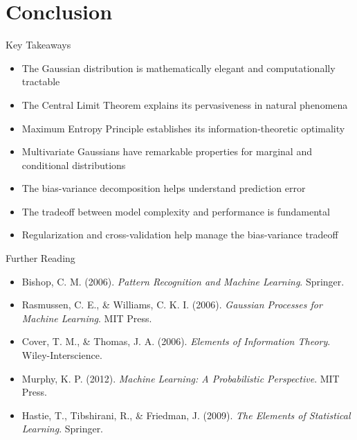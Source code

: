 \documentclass{beamer}
\begin{document}
\section{Conclusion}

\begin{frame}{Key Takeaways}
  \begin{itemize}
    \item The Gaussian distribution is mathematically elegant and computationally tractable
    \item The Central Limit Theorem explains its pervasiveness in natural phenomena
    \item Maximum Entropy Principle establishes its information-theoretic optimality
    \item Multivariate Gaussians have remarkable properties for marginal and conditional distributions
    \item The bias-variance decomposition helps understand prediction error
    \item The tradeoff between model complexity and performance is fundamental
    \item Regularization and cross-validation help manage the bias-variance tradeoff
  \end{itemize}
\end{frame}

\begin{frame}{Further Reading}
  \begin{itemize}
    \item Bishop, C. M. (2006). \textit{Pattern Recognition and Machine Learning}. Springer.
    \item Rasmussen, C. E., \& Williams, C. K. I. (2006). \textit{Gaussian Processes for Machine Learning}. MIT Press.
    \item Cover, T. M., \& Thomas, J. A. (2006). \textit{Elements of Information Theory}. Wiley-Interscience.
    \item Murphy, K. P. (2012). \textit{Machine Learning: A Probabilistic Perspective}. MIT Press.
    \item Hastie, T., Tibshirani, R., \& Friedman, J. (2009). \textit{The Elements of Statistical Learning}. Springer.
  \end{itemize}
\end{frame}
\end{document}
